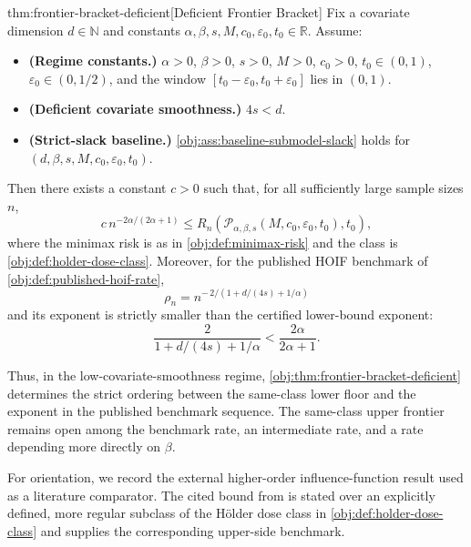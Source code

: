 \documentclass[11pt]{article}
\begin{document}
\begin{theoremv}{thm:frontier-bracket-deficient}[Deficient Frontier Bracket]
Fix a covariate dimension $d\in\mathbb N$ and constants
$\alpha,\beta,s,M,c_0,\varepsilon_0,t_0\in\mathbb R$.  Assume:
\begin{itemize}
\item \textbf{(Regime constants.)}  $\alpha>0$, $\beta>0$, $s>0$, $M>0$, $c_0>0$, $t_0\in(0,1)$, $\varepsilon_0\in(0,1/2)$, and the window $[t_0-\varepsilon_0,t_0+\varepsilon_0]$ lies in $(0,1)$.
\item \textbf{(Deficient covariate smoothness.)}  $4s<d$.
\item \textbf{(Strict-slack baseline.)}  \cref{obj:ass:baseline-submodel-slack} holds for $(d,\beta,s,M,c_0,\varepsilon_0,t_0)$.
\end{itemize}
Then there exists a constant $c>0$ such that, for all sufficiently large sample sizes $n$,
\[
c\,n^{-2\alpha/(2\alpha+1)}
\le
R_n\!\left(
\mathcal P_{\alpha,\beta,s}(M,c_0,\varepsilon_0,t_0),t_0
\right),
\]
where the minimax risk is as in \cref{obj:def:minimax-risk} and the class is \cref{obj:def:holder-dose-class}.  Moreover, for the published HOIF benchmark of \cref{obj:def:published-hoif-rate},
\[
\rho_n
=
n^{-\,2/(1+d/(4s)+1/\alpha)}
\]
and its exponent is strictly smaller than the certified lower-bound exponent:
\[
\frac{2}{1+d/(4s)+1/\alpha}
<
\frac{2\alpha}{2\alpha+1}.
\]
\end{theoremv}

Thus, in the low-covariate-smoothness regime, \cref{obj:thm:frontier-bracket-deficient} determines the strict ordering between the same-class lower floor and the exponent in the published benchmark sequence. The same-class upper frontier remains open among the benchmark rate, an intermediate rate, and a rate depending more directly on \(\beta\).

For orientation, we record the external higher-order influence-function result used as a literature comparator. The cited bound from \citet{bonvini2022} is stated over an explicitly defined, more regular subclass of the Hölder dose class in \cref{obj:def:holder-dose-class} and supplies the corresponding upper-side benchmark.
\end{document}
